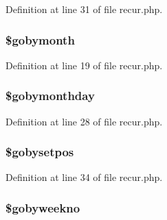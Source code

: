 \-Definition at line 31 of file recur.\-php.

\hypertarget{class_when_aad00c8e2ddca0ca728f5c39abc66ce65}{
\subsubsection[{\$gobymonth}]{\setlength{\rightskip}{0pt plus 5cm}\$gobymonth}}\label{class_when_aad00c8e2ddca0ca728f5c39abc66ce65}


\-Definition at line 19 of file recur.\-php.

\hypertarget{class_when_a259b16184aa8390f6becc888d1083c03}{
\subsubsection[{\$gobymonthday}]{\setlength{\rightskip}{0pt plus 5cm}\$gobymonthday}}\label{class_when_a259b16184aa8390f6becc888d1083c03}


\-Definition at line 28 of file recur.\-php.

\hypertarget{class_when_a9ae818cb1793028259c94c6f5338e7dd}{
\subsubsection[{\$gobysetpos}]{\setlength{\rightskip}{0pt plus 5cm}\$gobysetpos}}\label{class_when_a9ae818cb1793028259c94c6f5338e7dd}


\-Definition at line 34 of file recur.\-php.

\hypertarget{class_when_a58be6c219be700f106377416e3eee8e0}{
\subsubsection[{\$gobyweekno}]{\setlength{\rightskip}{0pt plus 5cm}\$gobyweekno}}\label{class_when_a58be6c219be700f106377416e3eee8e0}


